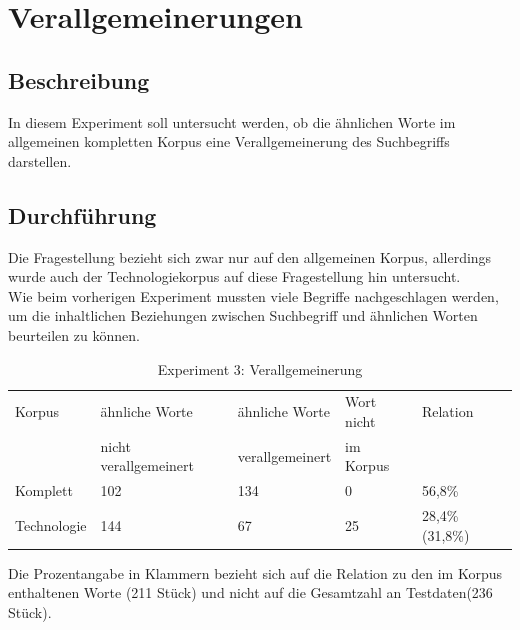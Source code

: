 \documentclass[12pt,a4paper]{report}
\begin{document}
		
	\newpage
	\section{Verallgemeinerungen}
		\subsection{Beschreibung}
		In diesem Experiment soll untersucht werden, ob die ähnlichen Worte im allgemeinen kompletten Korpus eine Verallgemeinerung des Suchbegriffs darstellen.\\
		
		\subsection{Durchführung}
		Die Fragestellung bezieht sich zwar nur auf den allgemeinen Korpus, allerdings wurde auch der Technologiekorpus auf diese Fragestellung hin untersucht.\\
		Wie beim vorherigen Experiment mussten viele Begriffe nachgeschlagen werden,  um die inhaltlichen Beziehungen zwischen Suchbegriff und ähnlichen Worten beurteilen zu können.\\
		
\begin{table}[h]
\caption{Experiment 3: Verallgemeinerung}
\begin{center}
\begin{tabular}{|l||l|l|l|l|}
\hline
Korpus & ähnliche Worte & ähnliche Worte  & Wort nicht  & Relation\\
 & nicht verallgemeinert & verallgemeinert & im Korpus & \\

\hline
\hline
 Komplett & 102 & 134 & 0 & 56,8\% \\
 \hline
 Technologie & 144 & 67 & 25 & 28,4\% (31,8\%)\\
 \hline
 
\end{tabular}
\end{center}
\end{table}

		Die Prozentangabe in Klammern bezieht sich auf die Relation zu den im Korpus enthaltenen Worte (211 Stück) und nicht auf die Gesamtzahl an Testdaten(236 Stück).\\
		
\end{document}
